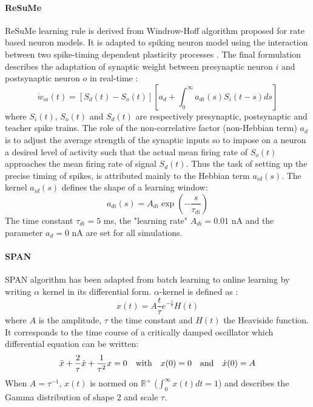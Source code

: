 \documentclass[11pt, a4paper]{article} %
\begin{document}
\paragraph{ReSuMe}
ReSuMe learning rule is derived from Windrow-Hoff algorithm proposed for rate based neuron models. It is adapted to spiking neuron model using the interaction between two spike-timing dependent plasticity processes \cite{ponulak2010supervised}. The final formulation describes the adaptation of synaptic weight between presynaptic neuron $i$ and postsynaptic neuron $o$ in real-time : \begin{equation}
\dot{w}_{oi}(t) = \left[ S_d(t) - S_o(t) \right] \left[ a_d + \int_0^\infty a_{di}(s) S_i(t-s) ds \right]
\end{equation}
where $S_i(t)$, $S_o(t)$ and $S_d(t)$ are respectively presynaptic, postsynaptic and teacher spike trains. The role of the non-correlative factor (non-Hebbian term) $a_d$ is to adjust the average strength of the synaptic inputs so to impose on a neuron a desired level of activity such that the actual mean firing rate of $S_o(t)$ approaches the mean firing rate of signal $S_d(t)$. Thus the task of setting up the precise timing of spikes, is attributed mainly to the Hebbian term $a_{id}(s)$. The kernel $a_{id}(s)$ defines the shape of a learning window: \begin{equation}
a_{di}(s) = A_{di} \exp (-\frac{s}{\tau_{di}})
\end{equation}
The time constant $\tau_{di} = 5$ ms, the "learning rate" $A_{di} = 0.01$ nA and the parameter $a_d = 0$ nA are set for all simulations.

\paragraph{SPAN}
SPAN algorithm has been adapted from batch learning \cite{mohemmed2012span, mohemmed2013training} to online learning by writing $\alpha$ kernel in its differential form. $\alpha$-kernel is defined as : \begin{equation}
x(t) = A \frac{t}{\tau} e^{-\frac{t}{\tau}} H(t)
\end{equation}
where $A$ is the amplitude, $\tau$ the time constant and $H(t)$ the Heaviside function.
It corresponds to the time course of a critically damped oscillator which differential equation can be written: \begin{equation}
\ddot{x} + \frac{2}{\tau} \dot{x} + \frac{1}{\tau^2} x = 0 \quad \textnormal{with} \quad x(0) = 0 \quad \textnormal{and} \quad \dot{x}(0) = A
\label{SPAN}
\end{equation}
When $A = \tau^{-1}$, $x(t)$ is normed on $\mathbb{R}^+$ ($\int_0^\infty x(t)dt = 1$) and describes the Gamma distribution of shape 2 and scale $\tau$.
\end{document}
